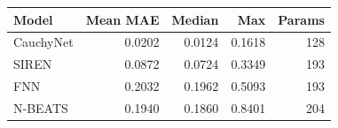 \begin{tabular}{lrrrr}
Model & Mean MAE & Median & Max & Params \\
\hline
CauchyNet & 0.0202 & 0.0124 & 0.1618 & 128 \\
SIREN & 0.0872 & 0.0724 & 0.3349 & 193 \\
FNN & 0.2032 & 0.1962 & 0.5093 & 193 \\
N-BEATS & 0.1940 & 0.1860 & 0.8401 & 204 \\
\end{tabular}

